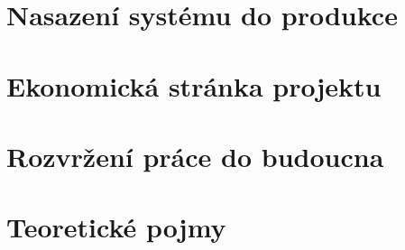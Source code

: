 \newpage
\chapter{Nasazení systému do produkce}\label{ch:nasazeni-systemu-do-produkce}
\textcolor{\textcolorname}{}

\newpage
\chapter{Ekonomická stránka projektu}\label{ch:ekonomicka-stranka-projektu}
\textcolor{\textcolorname}{}

\newpage
\chapter{Rozvržení práce do budoucna}\label{ch:rozvrzeni-prace-do-budoucna}
\textcolor{\textcolorname}{}

\newpage
\chapter{Teoretické pojmy}\label{ch:teoreticke-pojmy}
\textcolor{\textcolorname}{}






